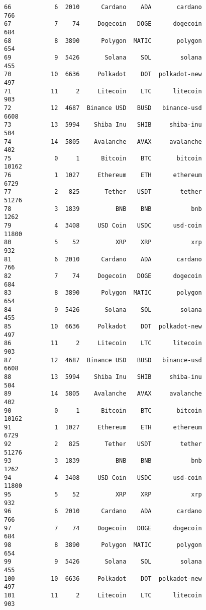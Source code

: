\documentclass[11pt]{article}
\begin{document}
\begin{tcolorbox}[breakable, size=fbox, boxrule=.5pt, pad at break*=1mm, opacityfill=0]
\begin{Verbatim}[commandchars=\\\{\}]
66            6  2010      Cardano    ADA       cardano               766
67            7    74     Dogecoin   DOGE      dogecoin               684
68            8  3890      Polygon  MATIC       polygon               654
69            9  5426       Solana    SOL        solana               455
70           10  6636     Polkadot    DOT  polkadot-new               497
71           11     2     Litecoin    LTC      litecoin               903
72           12  4687  Binance USD   BUSD   binance-usd              6608
73           13  5994    Shiba Inu   SHIB     shiba-inu               504
74           14  5805    Avalanche   AVAX     avalanche               402
75            0     1      Bitcoin    BTC       bitcoin             10162
76            1  1027     Ethereum    ETH      ethereum              6729
77            2   825       Tether   USDT        tether             51276
78            3  1839          BNB    BNB           bnb              1262
79            4  3408     USD Coin   USDC      usd-coin             11800
80            5    52          XRP    XRP           xrp               932
81            6  2010      Cardano    ADA       cardano               766
82            7    74     Dogecoin   DOGE      dogecoin               684
83            8  3890      Polygon  MATIC       polygon               654
84            9  5426       Solana    SOL        solana               455
85           10  6636     Polkadot    DOT  polkadot-new               497
86           11     2     Litecoin    LTC      litecoin               903
87           12  4687  Binance USD   BUSD   binance-usd              6608
88           13  5994    Shiba Inu   SHIB     shiba-inu               504
89           14  5805    Avalanche   AVAX     avalanche               402
90            0     1      Bitcoin    BTC       bitcoin             10162
91            1  1027     Ethereum    ETH      ethereum              6729
92            2   825       Tether   USDT        tether             51276
93            3  1839          BNB    BNB           bnb              1262
94            4  3408     USD Coin   USDC      usd-coin             11800
95            5    52          XRP    XRP           xrp               932
96            6  2010      Cardano    ADA       cardano               766
97            7    74     Dogecoin   DOGE      dogecoin               684
98            8  3890      Polygon  MATIC       polygon               654
99            9  5426       Solana    SOL        solana               455
100          10  6636     Polkadot    DOT  polkadot-new               497
101          11     2     Litecoin    LTC      litecoin               903

\end{Verbatim}
\end{tcolorbox}
\end{document}
